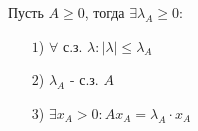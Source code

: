 \begin{theorem}[]\label{cha:7/the:2}
	Пусть $A \ge 0$, тогда $\exists \lambda_A \ge 0$:
	\begin{itemize}
		\item[$1$)]
			$\forall$ с.з. $\lambda: |\lambda| \le \lambda_A$
		\item[$2$)]
			$\lambda_A$ - с.з. $A$
		\item[$3$)]
			$\exists x_A > 0: A x_A = \lambda_A \cdot x_A$
	\end{itemize}
\end{theorem}

















